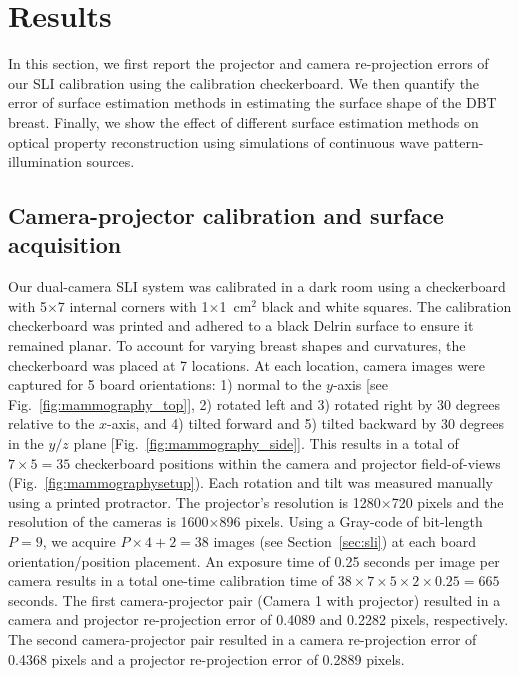 \section{Results}
\label{chap:omci:results}
In this section, we first report the projector and camera re-projection errors of our SLI calibration using the calibration checkerboard. We then quantify the error of surface estimation methods in estimating the surface shape of the DBT breast. Finally, we show the effect of different surface estimation methods on optical property reconstruction using simulations of continuous wave pattern-illumination sources. 

\subsection{Camera-projector calibration and surface acquisition}
\label{ssec:calibrationresults}
Our dual-camera SLI system was calibrated in a dark room using a checkerboard with 5$\times$7 internal corners with 1$\times$1~cm$^2$ black and white squares. The calibration checkerboard was printed and adhered to a black Delrin surface to ensure it remained planar. To account for varying breast shapes and curvatures, the checkerboard was placed at 7 locations. At each location, camera images were captured for 5 board orientations: 1) normal to the $y$-axis [see Fig.~\ref{fig:mammography_top}], 2) rotated left and 3) rotated right by 30 degrees relative to the $x$-axis, and 4) tilted forward and 5) tilted backward by 30 degrees in the $y/z$ plane [Fig.~\ref{fig:mammography_side}]. This results in a total of $7\times5=35$ checkerboard positions within the camera and projector field-of-views (Fig.~\ref{fig:mammographysetup}). Each rotation and tilt was measured manually using a printed protractor. The projector's resolution is 1280$\times$720 pixels and the resolution of the cameras is 1600$\times$896 pixels. Using a Gray-code of bit-length $P=9$, we acquire $P\times 4 + 2 = 38$ images (see Section~\ref{sec:sli}) at each board orientation/position placement. An exposure time of 0.25 seconds per image per camera results in a total one-time calibration time of $38 \times 7 \times 5 \times 2 \times 0.25 = 665$ seconds. The first camera-projector pair (Camera 1 with projector) resulted in a camera and projector re-projection error of 0.4089 and 0.2282 pixels, respectively. The second camera-projector pair resulted in a camera re-projection error of 0.4368 pixels and a projector re-projection error of 0.2889 pixels.


